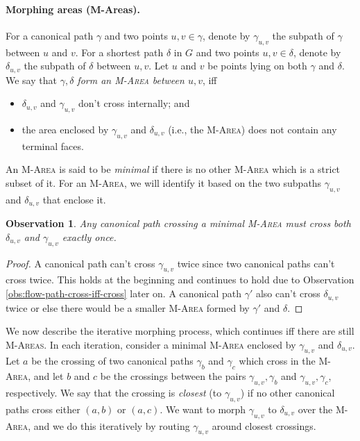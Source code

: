\documentclass[11pt]{article}
\newcommand{\george}[1]{{\color{green} George: #1}}
\newcommand{\zihan}[1]{{\color{blue} Zihan: #1}}
\newtheorem{observation}[theorem]{Observation}
\begin{document}
\paragraph{Morphing areas (M-Areas).}
For a canonical path $\gamma$ and two points $u,v\in\gamma$, denote by $\gamma_{u,v}$ the subpath of $\gamma$ between $u$ and $v$. For a shortest path $\delta$ in $G$ and two points $u,v\in\delta$, denote by $\delta_{u,v}$ the subpath of $\delta$ between $u,v$.
Let $u$ and $v$ be points lying on both $\gamma$ and $\delta$. We say that \emph{$\gamma,\delta$ form an \textsc{M-Area} between $u,v$}, iff 
\begin{itemize}
    \item $\delta_{u,v}$ and $\gamma_{u,v}$ don't cross internally; and
    \item the area enclosed by $\gamma_{u,v}$ and $\delta_{u,v}$ (i.e., the \textsc{M-Area}) does not contain any terminal faces.
\end{itemize} 
An \textsc{M-Area} is said to be \emph{minimal} if there is no other \textsc{M-Area} which is a strict subset of it. For an \textsc{M-Area}, we will identify it based on the two subpaths $\gamma_{u,v}$ and $\delta_{u,v}$ that enclose it.

\begin{observation}\label{obs:marea-top-bottom}
    Any canonical path crossing a minimal \textsc{M-Area} must cross both $\delta_{u,v}$ and $\gamma_{u,v}$ exactly once. 
\end{observation}
\begin{proof}
    A canonical path can't cross $\gamma_{u,v}$ twice since two canonical paths can't cross twice. This holds at the beginning and continues to hold due to Observation \ref{obs:flow-path-cross-iff-cross} later on. A canonical path $\gamma'$ also can't cross $\delta_{u,v}$ twice or else there would be a smaller \textsc{M-Area} formed by $\gamma'$ and $\delta$.
\end{proof}

We now describe the iterative morphing process, which continues iff there are still \textsc{M-Areas}.
In each iteration, consider a minimal \textsc{M-Area} enclosed by $\gamma_{u,v}$ and $\delta_{u,v}$. Let $a$ be the crossing of two canonical paths $\gamma_b$ and $\gamma_c$ which cross in the \textsc{M-Area}, and let $b$ and $c$ be the crossings between the pairs $\gamma_{u,v},\gamma_b$ and $\gamma_{u,v},\gamma_c$, respectively. We say that the crossing is \emph{closest} (to $\gamma_{u,v}$) if no other canonical paths cross either $(a,b)$ or $(a,c)$. We want to morph $\gamma_{u,v}$ to $\delta_{u,v}$ over the \textsc{M-Area}, and we do this iteratively by routing $\gamma_{u,v}$ around closest crossings.
\end{document}
